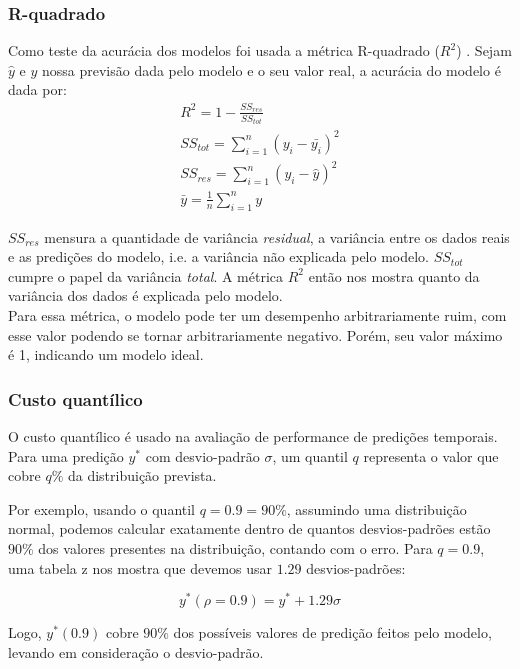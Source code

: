 \subsubsection{R-quadrado}
Como teste da acurácia dos modelos foi usada a métrica R-quadrado ($R^2$) \citep{cohen}. Sejam $\hat{y}$ e $y$ nossa previsão dada pelo modelo e o seu valor real, a acurácia do modelo é dada por:\\

\begin{align}
&R^2 = 1 - \frac{SS_{res}}{SS_{tot}} &\\
&SS_{tot} = \sum^n_{i=1} (y_i- \bar{y_i})^2 &\\
&SS_{res} = \sum^n_{i=1} (y_i - \hat{y})^2 &\\
&\bar{y} = \frac{1}{n} \sum^n_{i=1} y &
\end{align}

$SS_{res}$ mensura a quantidade de variância \textit{residual}, a
variância entre os dados reais e as predições do modelo, i.e. a variância não
explicada pelo modelo. $SS_{tot}$ cumpre o papel da variância \textit{total}. A métrica $R^2$
então nos mostra quanto da variância dos dados é explicada pelo modelo. \\

Para essa métrica, o modelo pode ter um desempenho arbitrariamente ruim, com esse valor
podendo se tornar arbitrariamente negativo. Porém, seu valor máximo é 1,
indicando um modelo ideal.\\


\subsubsection{Custo quantílico}

O custo quantílico \citep{deepar} é usado na avaliação de performance de
predições temporais. \\

Para uma predição $y^*$ com desvio-padrão $\sigma$, um quantil $q$ representa o
valor que cobre $q\%$ da distribuição prevista.

Por exemplo, usando o quantil $q=0.9=90\%$, assumindo uma distribuição normal,
podemos calcular exatamente dentro de quantos desvios-padrões estão $90\%$ dos valores
presentes na distribuição, contando com o erro. Para $q=0.9$, uma tabela z nos mostra que devemos
usar $1.29$ desvios-padrões:

\[
  y^*(\rho = 0.9) = y^* + 1.29\sigma
\]

Logo, $y^*(0.9)$ cobre $90\%$ dos possíveis valores de predição feitos pelo
modelo, levando em consideração o desvio-padrão.

